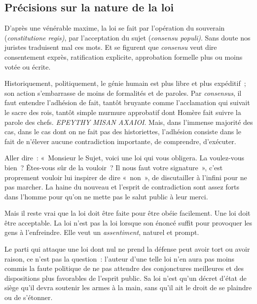 \documentclass[french,twoside]{book} %
\newcommand{\astermono}{\medskip\centerline{\color{rubric}\large\selectfont{\syms ✻}}\medskip\par}%
\begin{document}
\astermono

\subsection[Précisions sur la nature de la loi]{Précisions sur la nature de la loi}
\noindent D’après une vénérable maxime, la loi se fait par l’opération du souverain (\emph{constitutione regis)}, par l’acceptation du sujet (\emph{consensu populi)}. Sans doute nos juristes traduisent mal ces mots. Et se figurent que \emph{consensu} veut dire consentement exprès, ratification explicite, approbation formelle plus ou moins votée ou écrite.\par
Historiquement, politiquement, le génie humain est plus libre et plus expéditif ; son action s’embarrasse de moins de formalités et de paroles. Par \emph{consensus}, il faut entendre l’adhésion de fait, tantôt bruyante comme l’acclamation qui suivait le sacre des rois, tantôt simple murmure approbatif dont Homère fait suivre la parole des chefs. \emph{EPEYTHY MISAN AXAIOI}. Mais, dans l’immense majorité des cas, dans le cas dont on ne fait pas des historiettes, l’adhésion consiste dans le fait de n’élever aucune contradiction importante, de comprendre, d’exécuter.\par
Aller dire : « Monsieur le Sujet, voici une loi qui vous obligera. La voulez-vous bien ? Êtes-vous sûr de la vouloir ? Il nous faut votre signature », c’est proprement vouloir lui inspirer de dire « non », de discutailler à l’infini pour ne pas marcher. La haine du nouveau et l’esprit de contradiction sont assez forts dans l’homme pour qu’on ne mette pas le salut public à leur merci.\par
Mais il reste vrai que la loi doit être faite pour être obéie facilement. Une loi doit être acceptable. La loi n’est pas la loi lorsque son énoncé suffit pour provoquer les gens à l’enfreindre. Elle veut un \emph{assentiment}, naturel et prompt.\par
Le parti qui attaque une loi dont nul ne prend la défense peut avoir tort ou avoir raison, ce n’est pas la question : l’auteur d’une telle loi n’en aura pas moins commis la faute politique de ne pas attendre des conjonctures meilleures et des dispositions plus favorables de l’esprit public. Sa loi n’est qu’un décret d’état de siège qu’il devra soutenir les armes à la main, sans qu’il ait le droit de se plaindre ou de s’étonner.\par

\astermono
\end{document}
